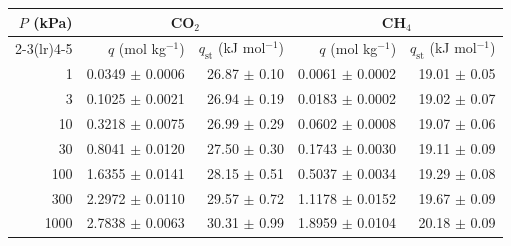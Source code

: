 \begin{tabular}{rrrrr}
\toprule
$P$ (kPa) & \multicolumn{2}{c}{CO$_2$} & \multicolumn{2}{c}{CH$_4$} \\
\cmidrule(lr){2-3}\cmidrule(lr){4-5}
 & $q$ (mol kg$^{-1}$) & $q_{\mathrm{st}}$ (kJ mol$^{-1}$) & $q$ (mol kg$^{-1}$) & $q_{\mathrm{st}}$ (kJ mol$^{-1}$) \\
\midrule
1 & 0.0349 $\pm$ 0.0006 & 26.87 $\pm$ 0.10 & 0.0061 $\pm$ 0.0002 & 19.01 $\pm$ 0.05 \\
3 & 0.1025 $\pm$ 0.0021 & 26.94 $\pm$ 0.19 & 0.0183 $\pm$ 0.0002 & 19.02 $\pm$ 0.07 \\
10 & 0.3218 $\pm$ 0.0075 & 26.99 $\pm$ 0.29 & 0.0602 $\pm$ 0.0008 & 19.07 $\pm$ 0.06 \\
30 & 0.8041 $\pm$ 0.0120 & 27.50 $\pm$ 0.30 & 0.1743 $\pm$ 0.0030 & 19.11 $\pm$ 0.09 \\
100 & 1.6355 $\pm$ 0.0141 & 28.15 $\pm$ 0.51 & 0.5037 $\pm$ 0.0034 & 19.29 $\pm$ 0.08 \\
300 & 2.2972 $\pm$ 0.0110 & 29.57 $\pm$ 0.72 & 1.1178 $\pm$ 0.0152 & 19.67 $\pm$ 0.09 \\
1000 & 2.7838 $\pm$ 0.0063 & 30.31 $\pm$ 0.99 & 1.8959 $\pm$ 0.0104 & 20.18 $\pm$ 0.09 \\
\bottomrule
\end{tabular}
